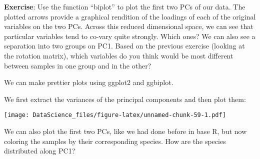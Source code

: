 \documentclass[
]{book}
\newenvironment{Shaded}{\begin{snugshade}}{\end{snugshade}}
\newcommand{\AttributeTok}[1]{\textcolor[rgb]{0.77,0.63,0.00}{#1}}
\newcommand{\DecValTok}[1]{\textcolor[rgb]{0.00,0.00,0.81}{#1}}
\newcommand{\FunctionTok}[1]{\textcolor[rgb]{0.00,0.00,0.00}{#1}}
\newcommand{\NormalTok}[1]{#1}
\newcommand{\OtherTok}[1]{\textcolor[rgb]{0.56,0.35,0.01}{#1}}
\newcommand{\SpecialCharTok}[1]{\textcolor[rgb]{0.00,0.00,0.00}{#1}}
\newcommand{\StringTok}[1]{\textcolor[rgb]{0.31,0.60,0.02}{#1}}
\begin{document}
\textbf{Exercise}: Use the function ``biplot'' to plot the first two PCs of our data. The plotted arrows provide a graphical rendition of the loadings of each of the original variables on the two PCs. Across this reduced dimensional space, we can see that particular variables tend to co-vary quite strongly. Which ones? We can also see a separation into two groups on PC1. Based on the previous exercise (looking at the rotation matrix), which variables do you think would be most different between samples in one group and in the other?

We can make prettier plots using ggplot2 and ggbiplot.

We first extract the variances of the principal components and then plot them:

\begin{Shaded}
\end{Shaded}

\texttt{[image: DataScience\_files/figure-latex/unnamed-chunk-59-1.pdf]}

We can also plot the first two PCs, like we had done before in base R, but now coloring the samples by their corresponding species. How are the species distributed along PC1?

\begin{Shaded}
\end{Shaded}
\end{document}
